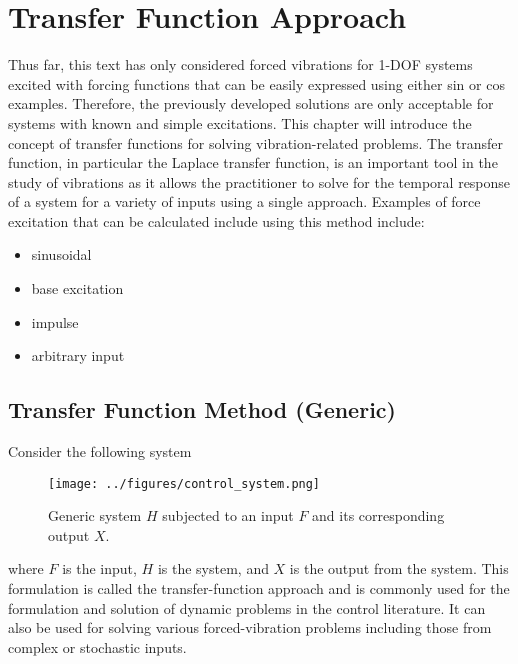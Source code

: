 \documentclass[12pt,letter]{article}
\begin{document}
	
	\setcounter{section}{3}	
	\setcounter{figure}{0}   
	\renewcommand\thefigure{\thesection.\arabic{figure}}
	\setcounter{equation}{0}   
	\renewcommand\theequation{\thesection.\arabic{equation}}

	\section{Transfer Function Approach}


		Thus far, this text has only considered forced vibrations for 1-DOF systems excited with forcing functions that can be easily expressed using either sin or cos examples. Therefore, the previously developed solutions are only acceptable for systems with known and simple excitations. This chapter will introduce the concept of transfer functions for solving vibration-related problems. The transfer function, in particular the Laplace transfer function, is an important tool in the study of vibrations as it allows the practitioner to solve for the temporal response of a system for a variety of inputs using a single approach. Examples of force excitation that can be calculated include using this method include:
		\begin{itemize}
			\item sinusoidal
			\item base excitation
			\item impulse
			\item arbitrary input
		\end{itemize}



		\subsection{Transfer Function Method (Generic)}


			Consider the following system

			\begin{figure}[H]
				\centering
				\texttt{[image: ../figures/control\_system.png]}
				\caption{Generic system $H$ subjected to an input $F$ and its corresponding output $X$.}
				\label{fig:control_system}
			\end{figure}

			\noindent where $F$ is the input, $H$ is the system, and $X$ is the output from the system. This formulation is called the transfer-function approach and is commonly used for the formulation and solution of dynamic problems in the control literature. It can also be used for solving various forced-vibration problems including those from complex or stochastic inputs. 
\end{document}

